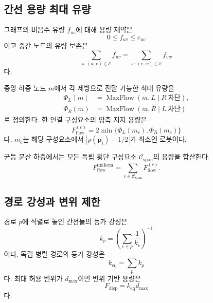 \documentclass[11pt,a4paper]{article}
\begin{document}
\subsection{간선 용량 최대 유량}

그래프의 비음수 유량 \(f_{uv}\)에 대해 용량 제약은
\begin{equation}
  0\le f_{uv}\le c_{uv}
\end{equation}
이고 중간 노드의 유량 보존은
\begin{equation}
  \sum_{u:(u,v)\in\mathcal{E}}f_{uv}
  =
  \sum_{w:(v,w)\in\mathcal{E}}f_{vw}
\end{equation}
다.

중앙 하중 노드 \(m\)에서 각 제방으로 전달 가능한 최대 유량을
\begin{align}
  \Phi_L(m)&=\operatorname{MaxFlow}(m,L\mid R\ \text{차단}),\\
  \Phi_R(m)&=\operatorname{MaxFlow}(m,R\mid L\ \text{차단})
\end{align}
로 정의한다. 한 연결 구성요소의 양측 지지 용량은
\begin{equation}
  F_{\mathrm{flow}}^{(c)}
  =
  2\min\{\Phi_L(m_c),\Phi_R(m_c)\}
  \label{eq:component-flow}
\end{equation}
다. \(m_c\)는 해당 구성요소에서 \(|\rho(\bm p_i)-1/2|\)가 최소인 로봇이다.

균등 분산 하중에서는 모든 독립 횡단 구성요소 \(\mathcal{C}_{\mathrm{span}}\)의 용량을 합산한다.
\begin{equation}
  F_{\mathrm{flow}}^{\mathrm{uniform}}
  =
  \sum_{c\in\mathcal{C}_{\mathrm{span}}}
  F_{\mathrm{flow}}^{(c)}.
  \label{eq:uniform-capacity}
\end{equation}

\subsection{경로 강성과 변위 제한}

경로 \(p\)에 직렬로 놓인 간선들의 등가 강성은
\begin{equation}
  k_p=
  \left(
    \sum_{e\in p}\frac{1}{k_e}
  \right)^{-1}
  \label{eq:path-stiffness}
\end{equation}
이다. 독립 병렬 경로의 등가 강성은
\begin{equation}
  k_{\mathrm{eq}}=\sum_p k_p
\end{equation}
다. 최대 허용 변위가 \(d_{\max}\)이면 변위 기반 용량은
\begin{equation}
  F_{\mathrm{disp}}=k_{\mathrm{eq}}d_{\max}
\end{equation}
다.
\end{document}
